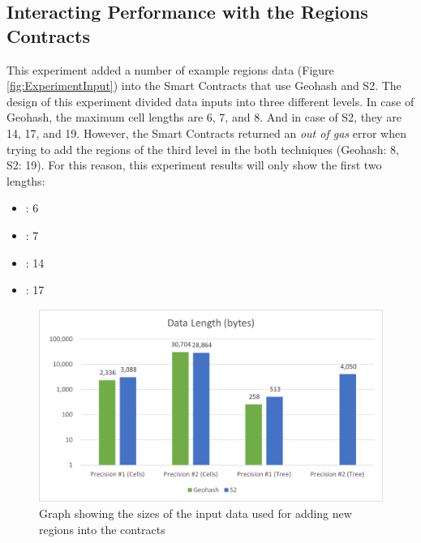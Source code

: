\subsection*{Interacting Performance with the Regions Contracts}

\npara This experiment added a number of example regions data (Figure \ref{fig:ExperimentInput}) into the Smart Contracts that use Geohash and S2.
The design of this experiment divided data inputs into three different levels.
In case of Geohash, the maximum cell lengths are 6, 7, and 8.
And in case of S2, they are 14, 17, and 19.
However, the Smart Contracts returned an \textit{out of gas} error when trying to add the regions of the third level in the both techniques (Geohash: 8, S2: 19).
For this reason, this experiment results will only show the first two lengths:

\begin{itemize}
  \item {}: 6
  \item {}: 7
  \item {}: 14
  \item {}: 17
\end{itemize}

\begin{figure}[htb!]
  \centering
  \includegraphics[width=\textwidth]{images/ExperimentRegionsLength.png}
  \caption{Graph showing the sizes of the input data used for adding new regions into the contracts}
  \label{fig:ExperimentRegionsLength}
\end{figure}

